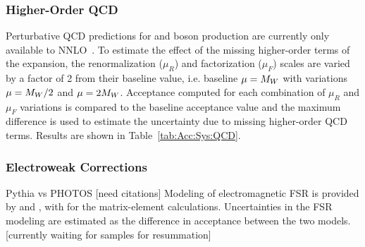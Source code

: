 \subsubsection{Higher-Order QCD}
Perturbative QCD predictions for \W and \Z boson production are currently only available to NNLO~\cite{Melnikov:2006kv,Catani:2009sm}. To estimate the effect of the missing higher-order terms of the expansion, the renormalization ($\mu_R$) and factorization ($\mu_F$) scales are varied by a factor of 2 from their baseline value, i.e. baseline $\mu = M_{W}$ with variations $\mu=M_{W}/2$ and $\mu=2M_{W}$. Acceptance computed for each combination of $\mu_R$ and $\mu_F$ variations is compared to the baseline acceptance value and the maximum difference is used to estimate the uncertainty due to missing higher-order QCD terms. Results are shown in Table~\ref{tab:Acc:Sys:QCD}.


\subsubsection{Electroweak Corrections}
Pythia vs PHOTOS [need citations] Modeling of electromagnetic FSR is provided by \PYTHIA and \PHOTOS, with \POWHEG for the matrix-element calculations. Uncertainties in the FSR modeling are estimated as the difference in acceptance between the two models.
[currently waiting for samples for resummation]




% 
% 
% 
% 


% 
% 
% 

%



% 
% 
% 

